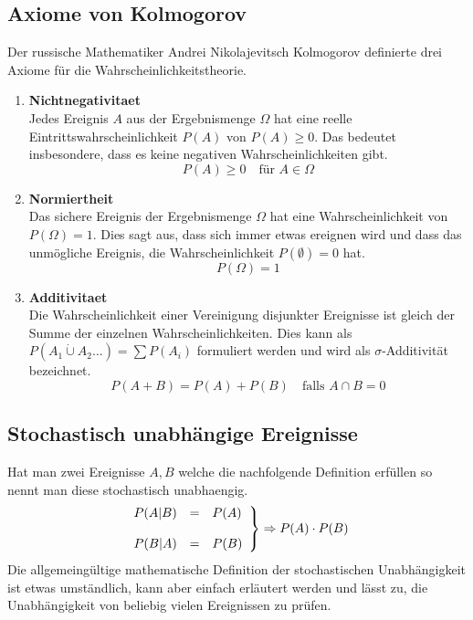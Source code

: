 \subsection{Axiome von Kolmogorov}
Der russische Mathematiker Andrei Nikolajevitsch \gls{Kolmogorov} 
definierte drei Axiome für die Wahrscheinlichkeitstheorie.
\begin{enumerate}
	\item \textbf{\gls{Nichtnegativitaet}} \\
		Jedes Ereignis $A$ aus der Ergebnismenge $\Omega$ hat eine 
		reelle Eintrittswahrscheinlichkeit $P(A)$ von 
		$P(A) \geq 0$. Das bedeutet insbesondere, dass es 
		keine negativen Wahrscheinlichkeiten gibt.
		\[ P(A) \geq 0 \quad \text{für } A \in \Omega \] 
	\item \textbf{\gls{Normiertheit}} \\
		Das sichere Ereignis der Ergebnismenge $\Omega$ hat eine
		Wahrscheinlichkeit von $P(\Omega)=1$. Dies sagt aus, dass
		sich immer etwas ereignen wird und dass das unmögliche
		Ereignis, die Wahrscheinlichkeit $P(\emptyset)=0$ hat.
		\[ P(\Omega) = 1 \]
	\item \textbf{\gls{Additivitaet}} \\
		Die Wahrscheinlichkeit einer Vereinigung disjunkter 
		Ereignisse ist gleich der Summe der einzelnen 
		Wahrscheinlichkeiten. Dies kann als 
		$P(A_1 \dot\cup A_2  \dots ) = \sum P(A_i)$ 
		formuliert werden und wird als $\sigma$-Additivität
		bezeichnet.
		\[ P(A+B) = P(A)+P(B) \quad \text{falls } A \cap B = 0 \]
\end{enumerate}

\subsection{Stochastisch unabhängige Ereignisse}
Hat man zwei Ereignisse $A,B$ welche die nachfolgende Definition erfüllen
so nennt man diese \gls{stochastisch unabhaengig}.
\[ \left. 
	\begin{array}{l c l}
		P(A|B)
			& =
			& P(A) \\
		& & \\
		P(B|A)
			& =
			& P(B) \\
	\end{array} \right\}
	\Rightarrow P(A) \cdot P(B)
\]
Die allgemeingültige mathematische Definition der stochastischen 
Unabhängigkeit ist
etwas umständlich, kann aber einfach erläutert werden und lässt zu,
die Unabhängigkeit von beliebig vielen Ereignissen zu prüfen.


